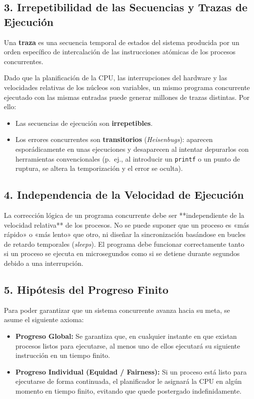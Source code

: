 \subsection{3. Irrepetibilidad de las Secuencias y Trazas de Ejecución}
\begin{definicion}
Una \textbf{traza} es una secuencia temporal de estados del sistema producida por un orden específico de intercalación de las instrucciones atómicas de los procesos concurrentes.
\end{definicion}

Dado que la planificación de la CPU, las interrupciones del hardware y las velocidades relativas de los núcleos son variables, un mismo programa concurrente ejecutado con las mismas entradas puede generar millones de trazas distintas. Por ello:
\begin{itemize}
    \item Las secuencias de ejecución son \textbf{irrepetibles}.
    \item Los errores concurrentes son \textbf{transitorios} (\textit{Heisenbugs}): aparecen esporádicamente en unas ejecuciones y desaparecen al intentar depurarlos con herramientas convencionales (p.~ej., al introducir un \texttt{printf} o un punto de ruptura, se altera la temporización y el error se oculta).
\end{itemize}

\subsection{4. Independencia de la Velocidad de Ejecución}
La corrección lógica de un programa concurrente debe ser **independiente de la velocidad relativa** de los procesos. No se puede suponer que un proceso es «más rápido» o «más lento» que otro, ni diseñar la sincronización basándose en bucles de retardo temporales (\textit{sleeps}). El programa debe funcionar correctamente tanto si un proceso se ejecuta en microsegundos como si se detiene durante segundos debido a una interrupción.

\subsection{5. Hipótesis del Progreso Finito}
Para poder garantizar que un sistema concurrente avanza hacia su meta, se asume el siguiente axioma:
\begin{definicion}
\begin{itemize}[leftmargin=*]
    \item \textbf{Progreso Global:} Se garantiza que, en cualquier instante en que existan procesos listos para ejecutarse, al menos uno de ellos ejecutará su siguiente instrucción en un tiempo finito.
    \item \textbf{Progreso Individual (Equidad / Fairness):} Si un proceso está listo para ejecutarse de forma continuada, el planificador le asignará la CPU en algún momento en tiempo finito, evitando que quede postergado indefinidamente.
\end{itemize}
\end{definicion}

